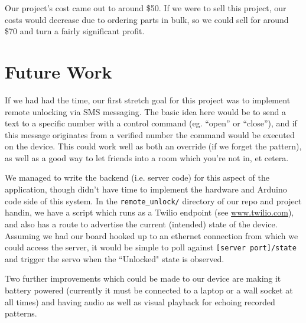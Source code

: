 \documentclass[11pt]{article}			%
\begin{document}
Our project's cost came out to around \$50. If we were to sell this project, our costs would decrease due to ordering parts in bulk, so we could sell for around \$70 and turn a fairly significant profit.

\section{Future Work}

If we had had the time, our first stretch goal for this project was to implement remote unlocking via SMS messaging. The basic idea here would be to send a text to a specific number with a control command (eg. ``open'' or ``close''), and if this message originates from a verified number the command would be executed on the device. This could work well as both an override (if we forget the pattern), as well as a good way to let friends into a room which you're not in, et cetera.

We managed to write the backend (i.e. server code) for this aspect of the application, though didn't have time to implement the hardware and Arduino code side of this system. In the \verb|remote_unlock/| directory of our repo and project handin, we have a script which runs as a Twilio endpoint (see \url{www.twilio.com}), and also has a route to advertise the current (intended) state of the device. Assuming we had our board hooked up to an ethernet connection from which we could access the server, it would be simple to poll against \verb|[server port]/state| and trigger the servo when the ``Unlocked" state is observed.

Two further improvements which could be made to our device are making it battery powered (currently it must be connected to a laptop or a wall socket at all times) and having audio as well as visual playback for echoing recorded patterns.
\end{document}
